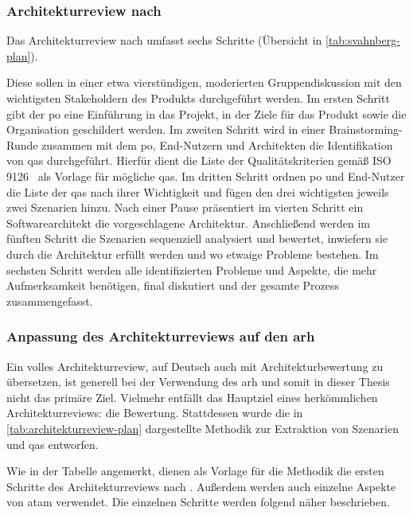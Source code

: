 \subsubsection{Architekturreview nach }

Das Architekturreview nach   umfasst sechs Schritte (Übersicht in \cref{tab:svahnberg-plan}).

Diese sollen in einer etwa vierstündigen, mo\-de\-rierten Gruppendiskussion mit den wichtigsten Stakeholdern des Produkts durchgeführt werden.
Im ersten Schritt gibt der \gls{po} eine Einführung in das Projekt, in der Ziele für das Produkt sowie die Organisation geschildert werden.
Im zweiten Schritt wird in einer Brainstorming-Runde zusammen mit dem \gls{po}, End-Nutzern und Architekten die Identifikation von \glspl{qa} durchgeführt.
Hierfür dient die Liste der Qualitätskriterien gemäß ISO 9126~\cite{ISO-9126} als Vorlage für mögliche \glspl{qa}.
Im dritten Schritt ordnen \gls{po} und End-Nutzer die Liste der \glspl{qa} nach ihrer Wichtigkeit und fügen den drei wichtigsten jeweils zwei Szenarien hinzu.
Nach einer Pause präsentiert im vierten Schritt ein Softwarearchitekt die vorgeschlagene Architektur.
Anschließend werden im fünften Schritt die Szenarien sequenziell analysiert und bewertet, inwiefern sie durch die Architektur erfüllt werden und wo etwaige Probleme bestehen.
Im sechsten Schritt werden alle identifizierten Probleme und Aspekte, die mehr Aufmerksamkeit benötigen, final diskutiert und der gesamte Prozess zusammengefasst.

\subsubsection{Anpassung des Architekturreviews auf den \gls{arh}}

Ein volles Architekturreview, auf Deutsch auch mit Architekturbewertung zu übersetzen, ist generell bei der Verwendung des \gls{arh} und somit in dieser Thesis nicht das primäre Ziel.
Vielmehr entfällt das Hauptziel eines herkömmlichen Architekturreviews: die Bewertung.
Stattdessen wurde die in \cref{tab:architekturreview-plan} dargestellte Methodik zur Extraktion von Szenarien und \glspl{qa} entworfen.


Wie in der Tabelle angemerkt, dienen als Vorlage für die Methodik die ersten Schritte des Ar\-chi\-tek\-turreviews nach .
Außerdem werden auch einzelne Aspekte von \gls{atam} \cite{kazman_2000} verwendet.
Die einzelnen Schritte werden folgend näher beschrieben.

